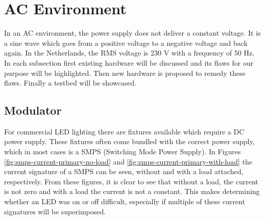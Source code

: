 
\section{AC Environment}
\label{sec:ac-environment}

In an AC environment, the power supply does not deliver a constant voltage.
It is a sine wave which goes from a positive voltage to a negative voltage and back again.
In the Netherlands, the RMS voltage is 230 V with a frequency of 50 Hz.
In each subsection first existing hardware will be discussed and its flaws for our purpose will be highlighted.
Then new hardware is proposed to remedy these flaws.
Finally a testbed will be showcased.





\subsection{Modulator}	

For commercial LED lighting there are fixtures available which require a DC power supply.
These fixtures often come bundled with the correct power supply, which in most cases is a SMPS (Switching Mode Power Supply).
In Figures \ref{fig:smps-current-primary-no-load} and \ref{fig:smps-current-primary-with-load} the current signature of a SMPS can be seen, without and with a load attached, respectively.
From these figures, it is clear to see that without a load, the current is not zero and with a load the current is not a constant.
This makes determining whether an LED was on or off difficult, especially if multiple of these current signatures will be superimposed.


